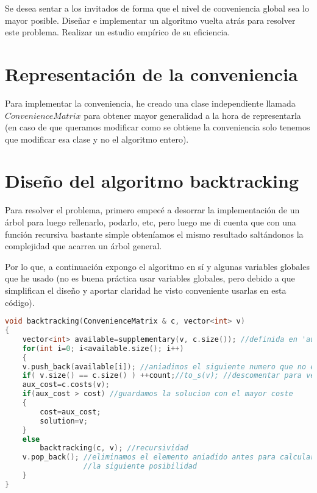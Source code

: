 \documentclass[11pt]{article}
\begin{document}
Se desea sentar a los invitados de forma que el nivel de conveniencia global sea lo mayor posible. Diseñar e implementar un algoritmo vuelta atrás para resolver este problema. Realizar un estudio empírico de su eficiencia.

\section{Representación de la conveniencia}

Para implementar la conveniencia, he creado una clase independiente llamada $ConvenienceMatrix$ para obtener mayor generalidad a la hora de representarla (en caso de que queramos modificar como se obtiene la conveniencia solo tenemos que modificar esa clase y no el algoritmo entero).

\section{Diseño del algoritmo backtracking}

Para resolver el problema, primero empecé a desorrar la implementación de un árbol para luego rellenarlo, podarlo, etc, pero luego me di cuenta que con una función recursiva bastante simple obteníamos el mismo resultado saltándonos la complejidad que acarrea un árbol general.

Por lo que, a continuación expongo el algoritmo en sí y algunas variables globales que he usado (no es buena práctica usar variables globales, pero debido a que simplifican el diseño y aportar claridad he visto conveniente usarlas en esta código).

\begin{lstlisting}[language=C++, caption=Función obejtivo]
void backtracking(ConvenienceMatrix & c, vector<int> v)
{
	vector<int> available=supplementary(v, c.size()); //definida en 'auxliar.cpp'
	for(int i=0; i<available.size(); i++)
	{
	v.push_back(available[i]); //aniadimos el siguiente numero que no este ya en la solucion
	if( v.size() == c.size() ) ++count;//to_s(v); //descomentar para ver todas las posibilidades
	aux_cost=c.costs(v);
	if(aux_cost > cost) //guardamos la solucion con el mayor coste
	{
		cost=aux_cost;
		solution=v;
	}
	else
		backtracking(c, v); //recursividad
	v.pop_back(); //eliminamos el elemento aniadido antes para calcular
				  //la siguiente posibilidad
	}
}
\end{lstlisting}
\end{document}
